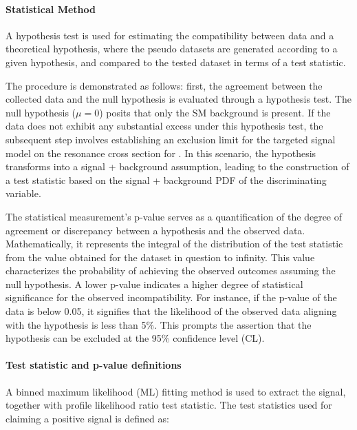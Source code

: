 \paragraph{Statistical Method}\mbox{}\par

A hypothesis test is used for estimating the compatibility between data and a theoretical hypothesis, where the pseudo datasets are generated according to a given hypothesis, and compared to the tested dataset in terms of a test statistic.

The procedure is demonstrated as follows: first, the agreement between the collected data and the null hypothesis is evaluated through a hypothesis test. The null hypothesis ($\mu = 0$) posits that only the SM background is present. If the data does not exhibit any substantial excess under this hypothesis test, the subsequent step involves establishing an exclusion limit for the targeted signal model on the resonance cross section for \mjj. In this scenario, the hypothesis transforms into a signal + background assumption, leading to the construction of a test statistic based on the signal + background PDF of the discriminating variable.

The statistical measurement's p-value serves as a quantification of the degree of agreement or discrepancy between a hypothesis and the observed data. Mathematically, it represents the integral of the distribution of the test statistic from the value obtained for the dataset in question to infinity. This value characterizes the probability of achieving the observed outcomes assuming the null hypothesis. A lower p-value indicates a higher degree of statistical significance for the observed incompatibility. For instance, if the p-value of the data is below 0.05, it signifies that the likelihood of the observed data aligning with the hypothesis is less than 5\%. This prompts the assertion that the hypothesis can be excluded at the 95\% confidence level (CL).


\paragraph{Test statistic and p-value definitions}\mbox{}\par

A binned maximum likelihood (ML) fitting method is used to extract the signal, together with profile likelihood ratio test statistic. The test statistics used for claiming a positive signal is defined as:

